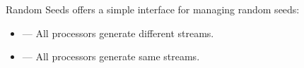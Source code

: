 \begin{frame}
  \begin{block}{Random Seeds}\pause
   offers a simple interface for managing random seeds:
    \begin{itemize}
      \item {} --- All
        processors generate different streams.
      \item {} --- All
        processors generate same streams.
    \end{itemize}
  \end{block}
\end{frame}



% 
% 
%   
% 
% 
% 




